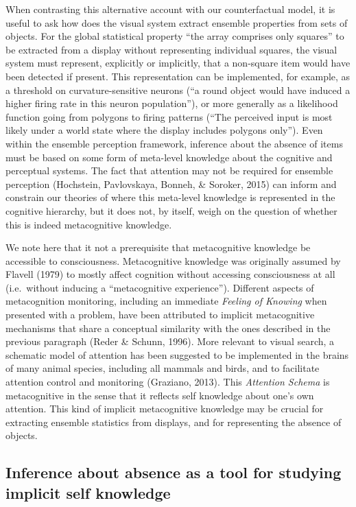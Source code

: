 \documentclass[
  english,
  man]{apa6}
\begin{document}
When contrasting this alternative account with our counterfactual model, it is useful to ask how does the visual system extract ensemble properties from sets of objects. For the global statistical property \enquote{the array comprises only squares} to be extracted from a display without representing individual squares, the visual system must represent, explicitly or implicitly, that a non-square item would have been detected if present. This representation can be implemented, for example, as a threshold on curvature-sensitive neurons (\enquote{a round object would have induced a higher firing rate in this neuron population}), or more generally as a likelihood function going from polygons to firing patterns (\enquote{The perceived input is most likely under a world state where the display includes polygons only}). Even within the ensemble perception framework, inference about the absence of items must be based on some form of meta-level knowledge about the cognitive and perceptual systems. The fact that attention may not be required for ensemble perception (Hochstein, Pavlovskaya, Bonneh, \& Soroker, 2015) can inform and constrain our theories of where this meta-level knowledge is represented in the cognitive hierarchy, but it does not, by itself, weigh on the question of whether this is indeed metacognitive knowledge.

We note here that it not a prerequisite that metacognitive knowledge be accessible to consciousness. Metacognitive knowledge was originally assumed by Flavell (1979) to mostly affect cognition without accessing consciousness at all (i.e.~without inducing a \enquote{metacognitive experience}). Different aspects of metacognition monitoring, including an immediate \emph{Feeling of Knowing} when presented with a problem, have been attributed to implicit metacognitive mechanisms that share a conceptual similarity with the ones described in the previous paragraph (Reder \& Schunn, 1996). More relevant to visual search, a schematic model of attention has been suggested to be implemented in the brains of many animal species, including all mammals and birds, and to facilitate attention control and monitoring (Graziano, 2013). This \emph{Attention Schema} is metacognitive in the sense that it reflects self knowledge about one's own attention. This kind of implicit metacognitive knowledge may be crucial for extracting ensemble statistics from displays, and for representing the absence of objects.

\hypertarget{inference-about-absence-as-a-tool-for-studying-implicit-self-knowledge}{%
\subsection{Inference about absence as a tool for studying implicit self knowledge}\label{inference-about-absence-as-a-tool-for-studying-implicit-self-knowledge}}
\end{document}
